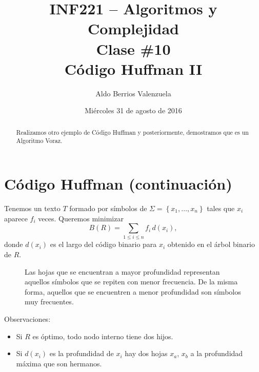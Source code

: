 \documentclass[english, spanish, fleqn, 10pt]{article}
\author{Aldo Berrios Valenzuela}
\title{INF221 -- Algoritmos y Complejidad\\[.4\baselineskip]Clase \#10\\Código Huffman II}
\date{Miércoles 31 de agosto de 2016}
\numberwithin{equation}{section}
\newcommand{\nparentesis}[1]{\left( #1 \right)}
\newcommand{\llaves}[1]{\left \{ #1 \right \}}
\theoremstyle{definition}
\begin{document}
\maketitle
\begin{abstract}
	Realizamos otro ejemplo de Código Huffman y posteriormente, demostramos que es un Algoritmo Voraz.
\end{abstract}
\section{Código Huffman (continuación)}
Tenemos un texto $T$ formado por símbolos de $\Sigma=\llaves{x_1, \ldots, x_n}$ tales que $x_i$ aparece $f_i$ veces. Queremos minimizar
\begin{equation*}
B\nparentesis{R}=\sum_{1\leq i\leq n} f_i\,d\nparentesis{x_i},
\end{equation*}
donde $d\nparentesis{x_i}$ es el largo del código binario para $x_i$ obtenido en el árbol binario de $R$.
\begin{figure}[!h]
	\centering
	\caption{Las hojas que se encuentran a mayor profundidad representan aquellos símbolos que se repiten con menor frecuencia. De la misma forma, aquellos que se encuentren a menor profundidad son símbolos muy frecuentes.}
\end{figure}

Observaciones:
\begin{itemize}
	\item Si $R$ es óptimo, todo nodo interno tiene dos hijos.
	\item Si $d\nparentesis{x_i}$ es la profundidad de $x_i$ hay dos hojas $x_a$, $x_b$ a la profundidad máxima que son hermanos.
\end{itemize}
\end{document}
